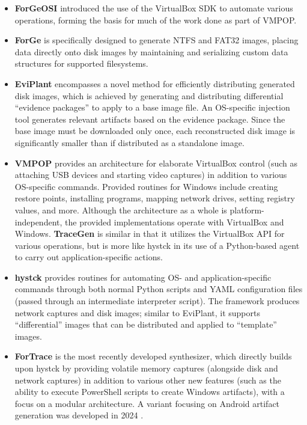 \documentclass[final,5p,times,twocolumn]{elsarticle}
\begin{document}
\begin{itemize}
\item
  \textbf{ForGeOSI} \citep{maxfraggMaxfraggForGeOSI2023} introduced
  the use of the VirtualBox SDK to automate various operations, forming
  the basis for much of the work done as part of VMPOP.
\item
  \textbf{ForGe} \citep{vistiAutomaticCreationComputer2015} is
  specifically designed to generate NTFS and FAT32 images, placing data
  directly onto disk images by maintaining and serializing custom data
  structures for supported filesystems.
\item
  \textbf{EviPlant} \citep{scanlonEviPlantEfficientDigital2017}
  encompasses a novel method for efficiently distributing generated disk
  images, which is achieved by generating and distributing differential
  ``evidence packages'' to apply to a base image file. An OS-specific
  injection tool generates relevant artifacts based on the evidence
  package. Since the base image must be downloaded only once, each
  reconstructed disk image is significantly smaller than if distributed
  as a standalone image.
\item
  \textbf{VMPOP} \citep{parkTREDEVMPOPCultivating2018} provides an
  architecture for elaborate VirtualBox control (such as attaching USB
  devices and starting video captures) in addition to various
  OS-specific commands. Provided routines for Windows include creating
  restore points, installing programs, mapping network drives, setting
  registry values, and more. Although the architecture as a whole is
  platform-independent, the provided implementations operate with
  VirtualBox and Windows. \textbf{TraceGen}
  \citep{duTraceGenUserActivity2021} is similar in that it utilizes
  the VirtualBox API for various operations, but is more like hystck in
  its use of a Python-based agent to carry out application-specific
  actions.
\item
  \textbf{hystck} \citep{gobelNovelApproachGenerating2020} provides
  routines for automating OS- and application-specific commands through
  both normal Python scripts and YAML configuration files (passed
  through an intermediate interpreter script). The framework produces
  network captures and disk images; similar to EviPlant, it supports
  ``differential'' images that can be distributed and applied to
  ``template'' images.
\item
  \textbf{ForTrace} \citep{gobelForTraceHolisticForensic2022} is the
  most recently developed synthesizer, which directly builds upon hystck
  by providing volatile memory captures (alongside disk and network
  captures) in addition to various other new features (such as the
  ability to execute PowerShell scripts to create Windows artifacts),
  with a focus on a modular architecture. A variant focusing on Android
  artifact generation was developed in 2024
  \citep{demmelDataSynthesisGoing2024}.
\end{itemize}
\end{document}
